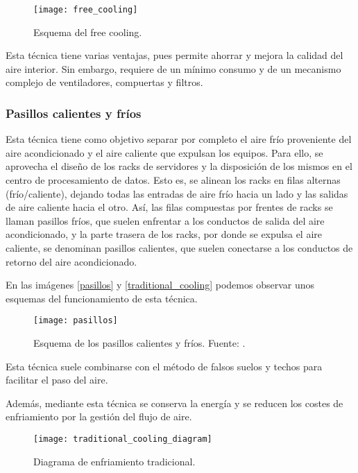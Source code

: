 \begin{figure}
    \begin{center}
        \texttt{[image: free\_cooling]}
        \caption{Esquema del free cooling.}
        \label{free_coling}
    \end{center}
\end{figure}

Esta técnica tiene varias ventajas, pues permite ahorrar y mejora la calidad del aire interior. Sin embargo, requiere de un mínimo consumo y de un mecanismo complejo de ventiladores, compuertas y filtros.

\subsubsection{Pasillos calientes y fríos}

Esta técnica tiene como objetivo separar por completo el aire frío proveniente del aire acondicionado y el aire caliente que expulsan los equipos. Para ello, se aprovecha el diseño de los racks de servidores y la disposición de los mismos en el centro de procesamiento de datos. Esto es, se alinean los racks en filas alternas (frío/caliente), dejando todas las entradas de aire frío hacia un lado y las salidas de aire caliente hacia el otro. Así, las filas compuestas por frentes de racks se llaman pasillos fríos, que suelen enfrentar a los conductos de salida del aire acondicionado, y la parte trasera de los racks, por donde se expulsa el aire caliente, se denominan pasillos calientes, que suelen conectarse a los conductos de retorno del aire acondicionado.

En las imágenes \eqref{pasillos} y \eqref{traditional_cooling} podemos observar unos esquemas del funcionamiento de esta técnica.

\begin{figure}
    \begin{center}
        \texttt{[image: pasillos]}
        \caption{Esquema de los pasillos calientes y fríos. Fuente: \cite{Kelvion}.}
        \label{pasillos}
    \end{center}
\end{figure}

Esta técnica suele combinarse con el método de falsos suelos y techos para facilitar el paso del aire.

Además, mediante esta técnica se conserva la energía y se reducen los costes de enfriamiento por la gestión del flujo de aire.

\begin{figure}
    \begin{center}
        \texttt{[image: traditional\_cooling\_diagram]}
        \caption{Diagrama de enfriamiento tradicional.}
        \label{traditional_cooling}
    \end{center}
\end{figure}

